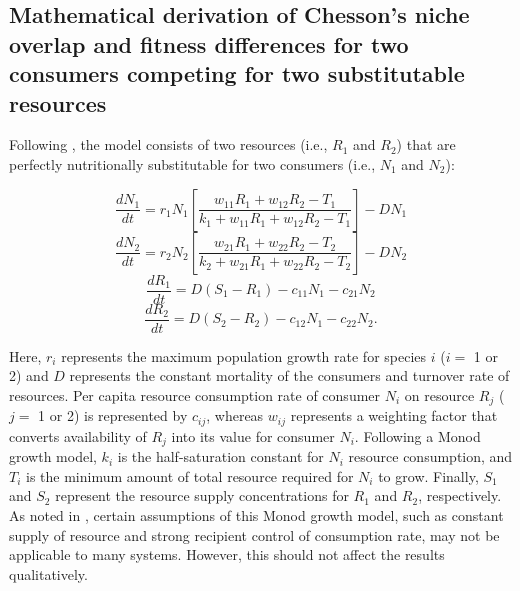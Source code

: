 \subsection{Mathematical derivation of Chesson's niche overlap and fitness differences for two consumers competing for two substitutable resources}
Following \citet[p.~270]{tilman1982}, the model consists of two resources (i.e., $R_{1}$ and $R_{2}$) that are perfectly nutritionally substitutable for two consumers (i.e., $N_{1}$ and $N_{2}$): 

\begin{equation}
\frac{{d{N_1}}}{{dt}} = {r_1}{N_1}\left[ {\frac{{{w_{11}}{R_1} + {w_{12}}{R_2} - {T_1}}}{{{k_1} + {w_{11}}{R_1} + {w_{12}}{R_2} - {T_1}}}} \right] - D{N_1} 
\tag{S2.2.1}\label{eq:S2.2.1}
\end{equation}
\begin{equation}
\frac{{d{N_2}}}{{dt}} = {r_2}{N_2}\left[ {\frac{{{w_{21}}{R_1} + {w_{22}}{R_2} - {T_2}}}{{{k_2} + {w_{21}}{R_1} + {w_{22}}{R_2} - {T_2}}}} \right] - D{N_2} 
\tag{S2.2.2}\label{eq:S2.2.2}
\end{equation}
\begin{equation}
\frac{{d{R_1}}}{{dt}} = D\left( {{S_1} - {R_1}} \right) - {c_{11}}{N_1} - {c_{21}}{N_2} \tag{S2.2.3}\label{eq:S2.2.3}
\end{equation}
\begin{equation}
\frac{{d{R_2}}}{{dt}} = D\left( {{S_2} - {R_2}} \right) - {c_{12}}{N_1} - {c_{22}}{N_2}.
\tag{S2.2.4}\label{eq:S2.2.4}
\end{equation}

\noindent Here, $r_{i}$ represents the maximum population growth rate for species $i$ ($i = $ 1 or 2) and $D$ represents the constant mortality of the consumers and turnover rate of resources. Per capita resource consumption rate of consumer $N_{i}$ on resource $R_{j}$ ($j = $ 1 or 2) is represented by $c_{ij}$, whereas $w_{ij}$ represents a weighting factor that converts availability of $R_{j}$ into its value for consumer $N_{i}$. Following a Monod growth model, $k_{i}$ is the half-saturation constant for $N_{i}$ resource consumption, and $T_{i}$ is the minimum amount of total resource required for $N_{i}$ to grow. Finally, $S_{1}$ and $S_{2}$ represent the resource supply concentrations for $R_{1}$ and $R_{2}$, respectively. As noted in \cite{Kleinhesselink2015}, certain assumptions of this Monod growth model, such as constant supply of resource and strong recipient control of consumption rate, may not be applicable to many systems. However, this should not affect the results qualitatively.
\par



